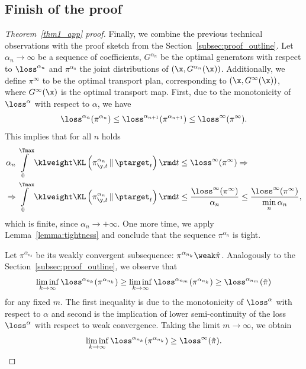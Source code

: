 \subsection{Finish of the proof}
\label{subsec:proof}
\begin{proof}[Theorem~\ref{thm1_app} proof]
Finally, we combine the previous technical observations with the proof sketch from the Section~\ref{subsec:proof_outline}. Let $\alpha_n \rightarrow \infty$ be a sequence of coefficients, $G^{\alpha_n}$ be the optimal generators with respect to $\loss^{\alpha_n}$ and $\pi^{\alpha_n}$ the joint distributions of $(\x, G^{\alpha_n}(\x))$. Additionally, we define $\pi^\infty$ to be the optimal transport plan, corresponding to $(\x, G^\infty(\x))$, where $G^\infty(\x)$ is the optimal transport map. First, due to the monotonicity of $\loss^\alpha$ with respect to $\alpha$, we have
\begin{equation}
    \loss^{\alpha_n}(\pi^{\alpha_n}) \leq \loss^{\alpha_{n + 1}}(\pi^{\alpha_{n + 1}}) \leq \loss^{\infty}(\pi^\infty).
\end{equation}
This implies that for all $n$ holds
\begin{align}
    \alpha_n &\int\limits_{0}^{\Tmax} \klweight \KL\left(\pi^{\alpha_n}_{\y, t} \,\|\, \ptarget_t\right) \rmd t \leq \loss^\infty(\pi^\infty) \Rightarrow \\
    \Rightarrow & \int\limits_{0}^{\Tmax} \klweight \KL\left(\pi^{\alpha_n}_{\y, t} \,\|\, \ptarget_t\right) \rmd t \leq \frac{\loss^\infty(\pi^\infty)}{\alpha_n} \leq \frac{\loss^\infty(\pi^\infty)}{\min\limits_{n} \alpha_n},
\end{align}
which is finite, since $\alpha_n \rightarrow +\infty$. One more time, we apply Lemma~\ref{lemma:tightness} and conclude that the sequence $\pi^{\alpha_n}$ is tight.

Let $\pi^{\alpha_{n_k}}$ be its weakly convergent subsequence: $\pi^{\alpha_{n_k}} \weak \hat{\pi}$. Analogously to the Section~\ref{subsec:proof_outline}, we observe that
\begin{equation}
    \liminf\limits_{k \rightarrow \infty} \loss^{\alpha_{n_k}} (\pi^{\alpha_{n_k}}) \geq \liminf\limits_{k \rightarrow \infty}\loss^{\alpha_{n_m}}(\pi^{\alpha_{n_k}}) \geq \loss^{\alpha_{n_m}}(\hat{\pi})
\end{equation}
for any fixed $m$. The first inequality is due to the monotonicity of $\loss^\alpha$ with respect to $\alpha$ and second is the implication of lower semi-continuity of the loss $\loss^\alpha$ with respect to weak convergence. Taking the limit $m \rightarrow \infty$, we obtain
\begin{equation}
     \liminf\limits_{k \rightarrow \infty} \loss^{\alpha_{n_k}} (\pi^{\alpha_{n_k}}) \geq \loss^{\infty}(\hat{\pi}).
\end{equation}



\end{proof}
